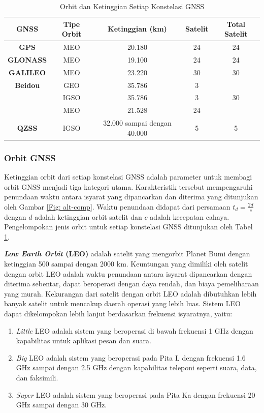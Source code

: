 \begin{table}[H]
	\caption{Orbit dan Ketinggian Setiap Konstelasi GNSS \cite{Li2019} \cite{Bury2019}}
	\vspace{0.5em}
	\centering
	\begin{tabular}{ccccc}
		\hline
		\textbf{GNSS} &\textbf{Tipe Orbit} & \textbf{Ketinggian (km)} & \textbf{Satelit} & \textbf{Total Satelit}\\
		\hline 
		\textbf{GPS} & MEO & 20.180 & 24 & 24\\
		\textbf{GLONASS} & MEO & 19.100 & 24 & 24\\
		\textbf{GALILEO} & MEO & 23.220 & 30 & 30\\
		\textbf{Beidou} & GEO & 35.786 & 3\\
		& IGSO & 35.786 & 3 & 30\\
		& MEO& 21.528 & 24\\
		\textbf{QZSS} & IGSO &32.000 sampai dengan 40.000 & 5 & 5\\
		\hline
	\end{tabular}
	\label{Tab: gnss-orbit}
\end{table}

\subsubsection{Orbit GNSS}
Ketinggian orbit dari setiap konstelasi GNSS adalah parameter untuk membagi orbit GNSS menjadi tiga kategori utama. Karakteristik tersebut mempengaruhi penundaan waktu antara isyarat yang dipancarkan dan diterima yang ditunjukan oleh Gambar \ref{Fig: alt-comp}. Waktu penundaan didapat dari persamaan $t_d = \frac{2d}{c}$ dengan $d$ adalah ketinggian orbit satelit dan $c$ adalah kecepatan cahaya. Pengelompokan jenis orbit untuk setiap konstelasi GNSS ditunjukan oleh Tabel \ref{Tab: gnss-orbit}.

\textbf{\textit{Low Earth Orbit} (LEO)} adalah satelit yang mengorbit Planet Bumi dengan ketinggian 500 sampai dengan 2000 km. Keuntungan yang dimiliki oleh satelit dengan orbit LEO adalah waktu penundaan antara isyarat dipancarkan dengan diterima sebentar, dapat beroperasi dengan daya rendah, dan biaya pemeliharaan yang murah. Kekurangan dari satelit dengan orbit LEO adalah dibutuhkan lebih banyak satelit untuk mencakup daerah operasi yang lebih luas. Sistem LEO dapat dikelompokan lebih lanjut berdasarkan frekuensi isyaratnya, yaitu:

\begin{enumerate}
	\item \textit{Little} LEO adalah sistem yang beroperasi di bawah frekuensi 1 GHz dengan kapabilitas untuk aplikasi pesan dan suara.
	\item \textit{Big} LEO adalah sistem yang beroperasi pada Pita L dengan frekuensi 1.6 GHz sampai dengan 2.5 GHz dengan kapabilitas teleponi seperti suara, data, dan faksimili.
	\item \textit{Super} LEO adalah sistem yang beroperasi pada Pita Ka dengan frekuensi 20 GHz sampai dengan 30 GHz.
\end{enumerate}

